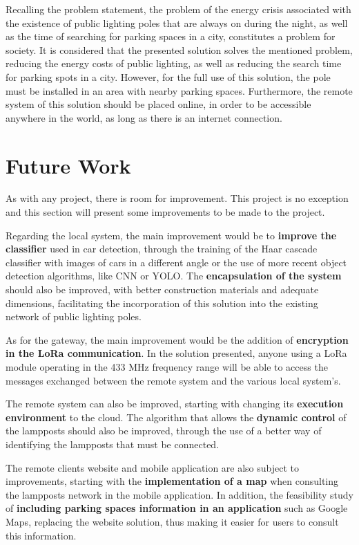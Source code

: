 Recalling the problem statement, the problem of the energy crisis associated with the existence of public lighting poles that are always on during the night, as well as the time of searching for parking spaces in a city, constitutes a problem for society. It is considered that the presented solution solves the mentioned problem, reducing the energy costs of public lighting, as well as reducing the search time for parking spots in a city. However, for the full use of this solution, the pole must be installed in an area with nearby parking spaces. Furthermore, the remote system of this solution should be placed online, in order to be accessible anywhere in the world, as long as there is an internet connection.

\section{Future Work}
As with any project, there is room for improvement. This project is no exception and this section will present some improvements to be made to the project.

Regarding the local system, the main improvement would be to \textbf{improve the classifier} used in car detection, through the training of the Haar cascade classifier with images of cars in a different angle or the use of more recent object detection algorithms, like CNN or YOLO. The \textbf{encapsulation of the system} should also be improved, with better construction materials and adequate dimensions, facilitating the incorporation of this solution into the existing network of public lighting poles.

As for the gateway, the main improvement would be the addition of \textbf{encryption in the LoRa communication}. In the solution presented, anyone using a LoRa module operating in the 433 MHz frequency range will be able to access the messages exchanged between the remote system and the various local system’s.

The remote system can also be improved, starting with changing its \textbf{execution environment} to the cloud. The algorithm that allows the \textbf{dynamic control} of the lampposts should also be improved, through the use of a better way of identifying the lampposts that must be connected.

The remote clients website and mobile application are also subject to improvements, starting with the \textbf{implementation of a map} when consulting the lampposts network in the mobile application. In addition, the feasibility study of \textbf{including parking spaces information in an application} such as Google Maps, replacing the website solution, thus making it easier for users to consult this information.
